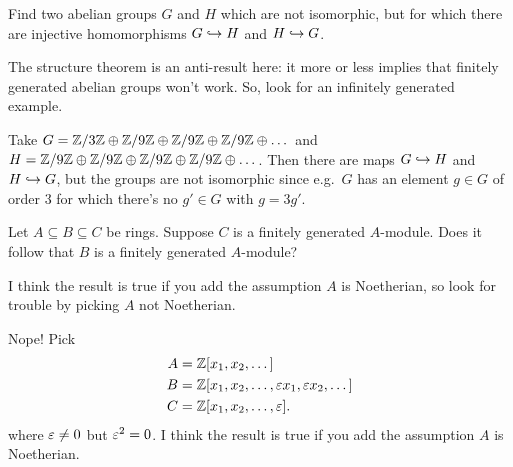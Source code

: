 \begin{problem}
	\gim
	Find two abelian groups $G$ and $H$ which are not isomorphic,
	but for which there are injective homomorphisms
	$G \hookrightarrow H$ and $H \hookrightarrow G$.
	\begin{hint}
		The structure theorem is an anti-result here:
		it more or less implies that finitely generated abelian groups won't work.
		So, look for an infinitely generated example.
	\end{hint}
	\begin{sol}
		Take $G = \mathbb Z/3\mathbb Z \oplus \mathbb Z/9\mathbb Z \oplus \mathbb Z/9\mathbb Z \oplus \mathbb Z/9\mathbb Z \oplus \dots$
		and $H = \mathbb Z/9\mathbb Z \oplus \mathbb Z/9\mathbb Z \oplus \mathbb Z/9\mathbb Z \oplus \mathbb Z/9\mathbb Z \oplus \dots$.
		Then there are maps $G \hookrightarrow H$ and $H \hookrightarrow G$,
		but the groups are not isomorphic since e.g.\
		$G$ has an element $g \in G$ of order $3$
		for which there's no $g' \in G$ with $g = 3g'$.
	\end{sol}
\end{problem}

\begin{problem} %
	\yod
	Let $A \subseteq B \subseteq C$ be rings.
	Suppose $C$ is a finitely generated $A$-module.
	Does it follow that $B$ is a finitely generated $A$-module?
	\begin{hint}
		I think the result is true if you add the assumption $A$ is Noetherian,
		so look for trouble by picking $A$ not Noetherian.
	\end{hint}
	\begin{sol}
		Nope! Pick
		\begin{align*}
			A &= \mathbb Z[x_1, x_2, \dots] \\
			B &= \mathbb Z[x_1, x_2, \dots, \varepsilon x_1, \varepsilon x_2, \dots] \\
			C &= \mathbb Z[x_1, x_2, \dots, \varepsilon].
		\end{align*}
		where $\varepsilon \neq 0$ but $\varepsilon^2 = 0$.
		I think the result is true if you add the assumption $A$ is Noetherian.
	\end{sol}
\end{problem}
